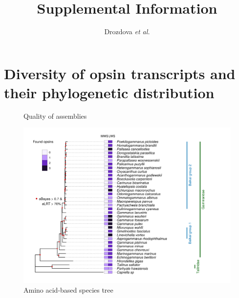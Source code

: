 \documentclass{article}
\begin{document}
	
\title{Supplemental Information} %
\author{Drozdova \textit{et al.}} %
\maketitle

\section{Diversity of opsin transcripts and their phylogenetic distribution}

\begin{figure}[H] 
	\caption{Quality of assemblies} \end{figure}


\begin{figure}[H] 
	\includegraphics[scale=0.85]{../species_tree/aa_tree.png}
	\caption{Amino acid-based species tree} \end{figure}
	
	
\end{document}
